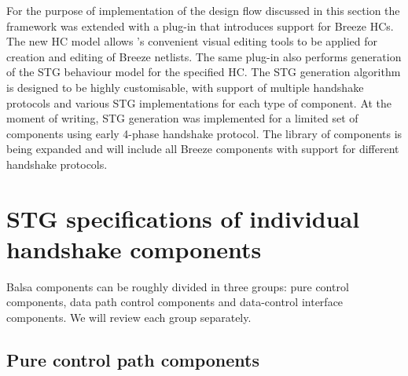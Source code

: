 For the purpose of implementation of the design flow discussed in
this section the  framework was extended with a plug-in
that introduces support for Breeze HCs. The new HC model allows 's
convenient visual editing tools to be applied for creation and editing
of Breeze netlists. The same plug-in also performs generation of the
STG behaviour model for the specified HC. The STG generation algorithm
is designed to be highly customisable, with support of multiple handshake
protocols and various STG implementations for each type of component.
At the moment of writing, STG generation was implemented for a limited
set of components using early 4-phase handshake protocol. The library
of components is being expanded and will include all Breeze components
with support for different handshake protocols.


\section{STG specifications of individual handshake components\label{sec:Individual-component-examples}}

Balsa components can be roughly divided in three groups: pure control
components, data path control components and data-control interface
components. We will review each group separately.


\subsection{Pure control path components}

